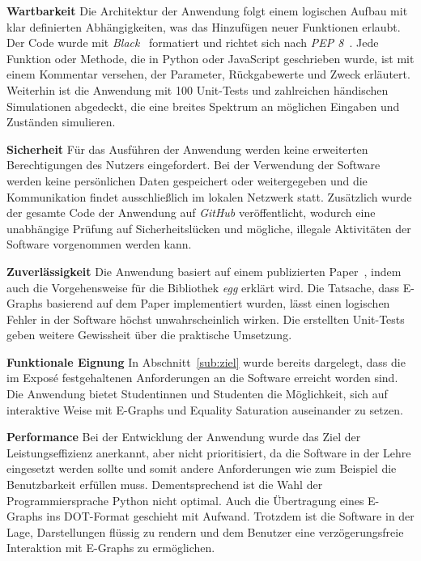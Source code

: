 \noindent\textbf{Wartbarkeit} Die Architektur der Anwendung folgt einem logischen Aufbau mit klar definierten Abhängigkeiten, was das Hinzufügen neuer Funktionen erlaubt.
Der Code wurde mit \textit{Black}~\cite{black} formatiert und richtet sich nach \textit{PEP 8}~\cite{pep}. Jede Funktion oder Methode, die in Python oder JavaScript geschrieben wurde, 
ist mit einem Kommentar versehen, der Parameter, Rückgabewerte und Zweck erläutert. Weiterhin ist die Anwendung mit 100 Unit-Tests und zahlreichen händischen Simulationen abgedeckt, die eine breites Spektrum an 
möglichen Eingaben und Zuständen simulieren.

\noindent\textbf{Sicherheit} Für das Ausführen der Anwendung werden keine erweiterten Berechtigungen des Nutzers eingefordert. Bei der Verwendung der Software werden keine persönlichen Daten gespeichert 
oder weitergegeben und die Kommunikation findet ausschließlich im lokalen Netzwerk statt.
Zusätzlich wurde der gesamte Code der Anwendung auf \textit{GitHub} veröffentlicht, wodurch eine unabhängige Prüfung auf Sicherheitslücken und mögliche, illegale Aktivitäten der Software vorgenommen werden kann.

\noindent\textbf{Zuverlässigkeit} Die Anwendung basiert auf einem publizierten Paper~\cite{2021-egg}, indem auch die Vorgehensweise für die Bibliothek \textit{egg} erklärt wird.
Die Tatsache, dass E-Graphs basierend auf dem Paper implementiert wurden, lässt einen logischen Fehler in der Software höchst unwahrscheinlich wirken.
Die erstellten Unit-Tests geben weitere Gewissheit über die praktische Umsetzung.


\noindent\textbf{Funktionale Eignung} In Abschnitt~\ref{sub:ziel} wurde bereits dargelegt, dass die im Exposé festgehaltenen Anforderungen an die Software erreicht worden sind.
Die Anwendung bietet Studentinnen und Studenten die Möglichkeit, sich auf interaktive Weise mit E-Graphs und Equality Saturation auseinander zu setzen.





\noindent\textbf{Performance} Bei der Entwicklung der Anwendung wurde das Ziel der Leistungseffizienz anerkannt, aber nicht prioritisiert, da die Software in der Lehre eingesetzt werden sollte
und somit andere Anforderungen wie zum Beispiel die Benutzbarkeit erfüllen muss. Dementsprechend ist die Wahl der Programmiersprache Python nicht optimal. Auch die Übertragung eines E-Graphs ins DOT-Format 
geschieht mit Aufwand. Trotzdem ist die Software in der Lage, Darstellungen flüssig zu rendern und dem Benutzer eine verzögerungsfreie Interaktion mit E-Graphs zu ermöglichen.

